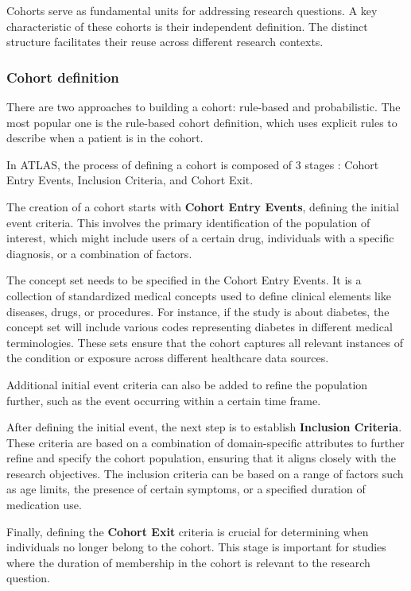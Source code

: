 Cohorts serve as fundamental units for addressing research questions. A key characteristic of these cohorts is their independent definition. The distinct structure facilitates their reuse across different research contexts.


\subsubsection{Cohort definition}

There are two approaches to building a cohort: rule-based and probabilistic. The most popular one is the rule-based cohort definition, which uses explicit rules to describe when a patient is in the cohort.

In ATLAS, the process of defining a cohort is composed of 3 stages \cite{informatics_chapter_nodate}: Cohort Entry Events, Inclusion Criteria, and Cohort Exit.

The creation of a cohort starts with \textbf{Cohort Entry Events}, defining the initial event criteria. This involves the primary identification of the population of interest, which might include users of a certain drug, individuals with a specific diagnosis, or a combination of factors. 

The concept set needs to be specified in the Cohort Entry Events. It is a collection of standardized medical concepts used to define clinical elements like diseases, drugs, or procedures. For instance, if the study is about diabetes, the concept set will include various codes representing diabetes in different medical terminologies. These sets ensure that the cohort captures all relevant instances of the condition or exposure across different healthcare data sources.

Additional initial event criteria can also be added to refine the population further, such as the event occurring within a certain time frame.

After defining the initial event, the next step is to establish \textbf{Inclusion Criteria}. These criteria are based on a combination of domain-specific attributes to further refine and specify the cohort population, ensuring that it aligns closely with the research objectives. The inclusion criteria can be based on a range of factors such as age limits, the presence of certain symptoms, or a specified duration of medication use.

Finally, defining the \textbf{Cohort Exit} criteria is crucial for determining when individuals no longer belong to the cohort. This stage is important for studies where the duration of membership in the cohort is relevant to the research question.

